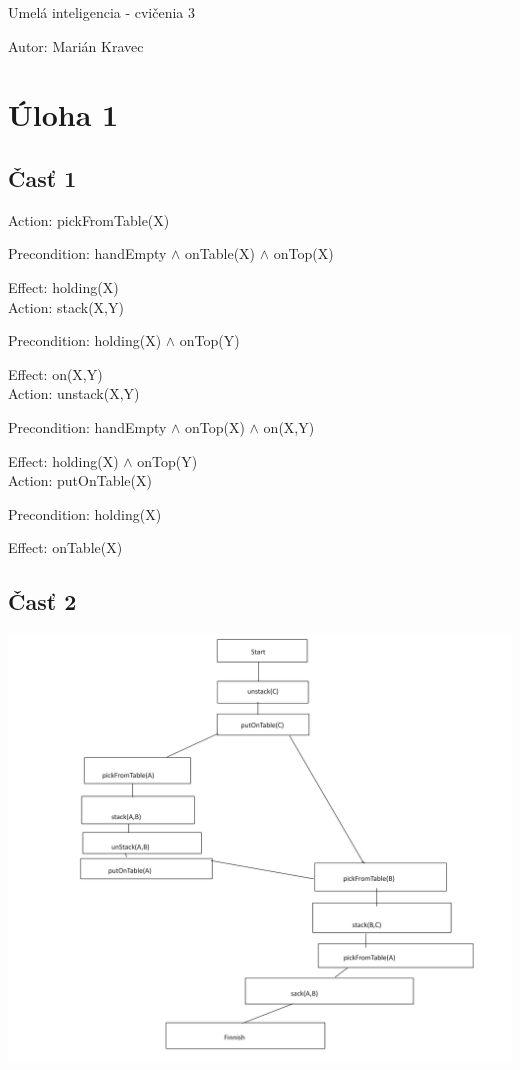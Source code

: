 \documentclass[a4paper]{article}
\begin{document}
 
	
\pagestyle{plain}

\begin{center}
	\sc\large
	Umelá inteligencia - cvičenia 3
\end{center}

Autor: Marián Kravec

\section{Úloha 1}
\subsection{Časť 1}

Action: pickFromTable(X)

Precondition: handEmpty $\land$ onTable(X) $\land$ onTop(X)

Effect: holding(X) 
\\

Action: stack(X,Y)

Precondition: holding(X) $\land$ onTop(Y)

Effect: on(X,Y)
\\

Action: unstack(X,Y)

Precondition: handEmpty $\land$ onTop(X) $\land$ on(X,Y)

Effect: holding(X) $\land$ onTop(Y)
\\

Action: putOnTable(X)

Precondition: holding(X)

Effect: onTable(X)
\\

\subsection{Časť 2}

\includegraphics[width=\textwidth]{pop.png}
\end{document}
